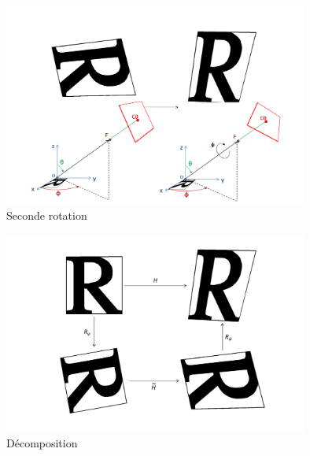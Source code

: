 \documentclass[c,12pt]{beamer}
\begin{document}
  \begin{frame}
  \begin{figure}
   \centering
   \includegraphics[width=100mm]{beamer_decompo3_rotation_psi.png}
   \caption{Seconde rotation}
  \end{figure}
  \end{frame}

  \begin{frame}
  \begin{figure}
   \centering
   \includegraphics[width=100mm]{beamer_decompo_bilan.png}
   \caption{Décomposition}
  \end{figure}
  \end{frame}
\end{document}

